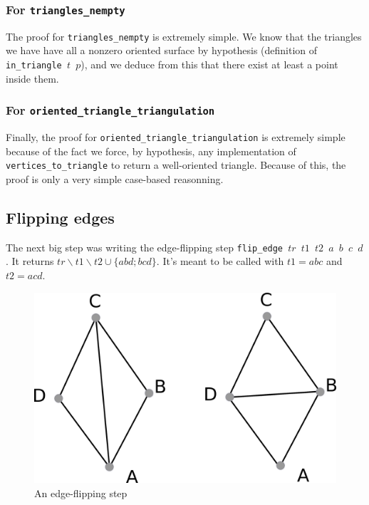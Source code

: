 \documentclass[a4paper,10pt]{article}
\begin{document}
  \subsubsection{For {\tt triangles\_nempty}}

  The proof for {\tt triangles\_nempty} is extremely simple. We know that the triangles we have have all a nonzero oriented surface by hypothesis (definition of {\tt in\_triangle $t$ $p$}), and we deduce from this that there exist at least a point inside them.

  \subsubsection{For {\tt oriented\_triangle\_triangulation}}
  \label{oriented_simple}
  Finally, the proof for {\tt oriented\_triangle\_triangulation} is extremely simple because of the fact we force, by hypothesis, any implementation of {\tt vertices\_to\_triangle} to return a well-oriented triangle. Because of this, the proof is only a very simple case-based reasonning.

  
\subsection{Flipping edges}
The next big step was writing the edge-flipping step {\tt flip\_edge $tr$ $t1$ $t2$ $a$ $b$ $c$ $d$}.
It returns $tr \smallsetminus t1 \smallsetminus t2 \cup \{abd;bcd\}$. It's meant to be called with $t1 = abc$ and $t2=acd$.

\begin{figure}[h]
  \centering
  \caption{\label{flip_edge} An edge-flipping step}
  \includegraphics[scale=2]{flip_edge}
\end{figure}
\end{document}
